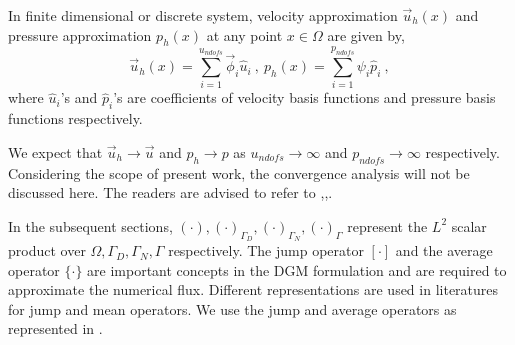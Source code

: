 \documentclass[graybox]{svmult}
\begin{document}
In finite dimensional or discrete system, velocity approximation $\overrightarrow{u}_h(x)$ and pressure approximation $p_h(x)$ at any point $x \in \Omega$ are given by,
\begin{equation}\label{velocity_pressure_coefficients}
\overrightarrow{u}_h(x) = \sum\limits_{i=1}^{u_{ndofs}} \overrightarrow{\phi}_i \hat{u}_i \ , \
p_h(x) = \sum\limits_{i=1}^{p_{ndofs}} \psi_i \hat{p}_i \ ,
\end{equation}
where $\hat{u}_i$'s and $\hat{p}_i$'s are coefficients of velocity basis functions and pressure basis functions respectively. 

We expect that $\overrightarrow{u}_h \rightarrow \overrightarrow{u}$ and $p_h \rightarrow p$ as $u_{ndofs} \rightarrow \infty$ and $p_{ndofs} \rightarrow \infty$ respectively. Considering the scope of present work, the convergence analysis will not be discussed here. The readers are advised to refer to \cite{pacciarini},\cite{jump_mean_operator},\cite{riviere}.


In the subsequent sections, $\left( \cdot \right),\left( \cdot \right)_{\Gamma_D},\left( \cdot \right)_{\Gamma_N},\left( \cdot \right)_{\Gamma}$ represent the $L^2$ scalar product over $\Omega,\Gamma_D,\Gamma_N,\Gamma$ respectively. The jump operator $\left[ \cdot \right]$ and the average operator $\lbrace \cdot \rbrace$ are important concepts in the DGM formulation and are required to approximate the numerical flux. Different representations are used in literatures for jump and mean operators. We use the jump and average operators as represented in \cite{jump_mean_operator}.
\end{document}
